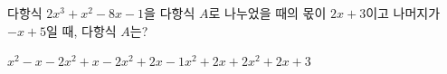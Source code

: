 다항식 $2x^3+x^2-8x-1$을 다항식 $A$로 나누었을 때의 몫이 $2x+3$이고 나머지가 $-x+5$일 때, 다항식 $A$는?
\begin{choicesii}{$x^2-x-2$}{$x^2+x-2$}{$x^2+2x-1$}{$x^2+2x+2$}{$x^2+2x+3$}\end{choicesii}

